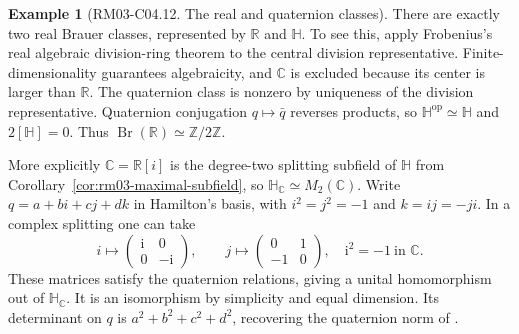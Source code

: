\documentclass[11pt,oneside,openany]{book}
\theoremstyle{definition}
\newtheorem{example}[theorem]{Example}
\theoremstyle{remark}
\begin{document}
\begin{example}[RM03-C04.12. The real and quaternion classes]
\label{ex:rm03-brauer-real}
There are exactly two real Brauer classes, represented by
\(\mathbb R\) and \(\mathbb H\). To see this, apply
Frobenius's real algebraic division-ring theorem
\cite[K07.23.frobenius]{d07} to the central division
representative. Finite-dimensionality guarantees
algebraicity, and \(\mathbb C\) is excluded because its
center is larger than \(\mathbb R\). The quaternion class
is nonzero by uniqueness of the division representative.
Quaternion conjugation \(q\mapsto\bar q\) reverses products,
so \(\mathbb H^{\mathrm{op}}\simeq\mathbb H\) and
\(2[\mathbb H]=0\). Thus
\(\operatorname{Br}(\mathbb R)\simeq\mathbb Z/2\mathbb Z\).

More explicitly \(\mathbb C=\mathbb R[i]\) is the degree-two
splitting subfield of \(\mathbb H\) from
Corollary~\ref{cor:rm03-maximal-subfield}, so
\(\mathbb H_{\mathbb C}\simeq M_2(\mathbb C)\).
Write \(q=a+bi+cj+dk\) in Hamilton's basis, with
\(i^2=j^2=-1\) and \(k=ij=-ji\). In a complex splitting one
can take
\[
 i\longmapsto \begin{pmatrix}\mathrm i&0\\0&-\mathrm i\end{pmatrix},
 \qquad j\longmapsto \begin{pmatrix}0&1\\-1&0\end{pmatrix},
 \quad \mathrm i^2=-1\ \text{in }\mathbb C .
\]
These matrices satisfy the quaternion relations, giving a
unital homomorphism out of \(\mathbb H_{\mathbb C}\).
It is an isomorphism by simplicity and equal dimension.
Its determinant on \(q\) is \(a^2+b^2+c^2+d^2\), recovering
the quaternion norm of \cite[K07.23.quaternion\_algebra]{d07}.
\end{example}
\end{document}
